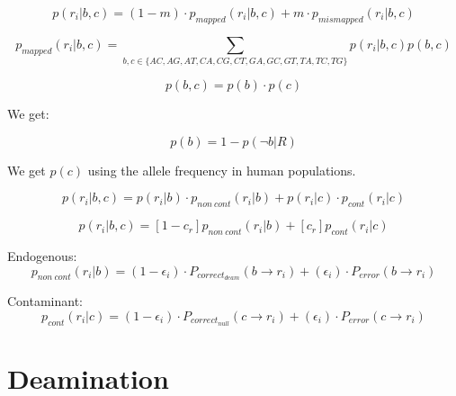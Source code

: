 \documentclass[a4paper,12pt]{article}
\begin{document}
\begin{equation}
p(r_i|b,c)  = (1-m) \cdot p_{mapped}(r_i|b,c) + m \cdot p_{mismapped}(r_i|b,c)  %
\end{equation}


\begin{equation}
p_{mapped}(r_i|b,c) = \sum\limits_{ b,c \in \{AC,AG,AT,CA,CG,CT,GA,GC,GT,TA,TC,TG\} } p(r_i|b,c) p(b,c)
\end{equation}

\begin{equation}
p(b,c) = p(b) \cdot p(c)
\end{equation}

\noindent We get:

\begin{equation}
p(b)  = 1 - p(\neg b|R)
\end{equation}

\noindent  We get $p(c)$ using the allele frequency in human populations.

\begin{equation}
p(r_i|b,c)  =  p(r_i|b) \cdot p_{non\ cont}(r_i|b)  +  p(r_i|c) \cdot p_{cont}(r_i|c) 
\end{equation}


\begin{equation}
p(r_i|b,c)  =  [1-c_r]  p_{non\ cont}(r_i|b) +  [c_r] p_{cont}(r_i|c) 
\end{equation}

\noindent Endogenous:
\begin{equation}
p_{non\ cont}(r_i|b) = (1-\epsilon_i ) \cdot  P_{correct_{deam}}( b \to r_i) +  (\epsilon_i) \cdot P_{error}(  b \to r_i )   
\end{equation}

\noindent Contaminant:
\begin{equation}
p_{cont}(r_i|c) = (1-\epsilon_i ) \cdot  P_{correct_{null}}( c \to r_i) +  (\epsilon_i) \cdot P_{error}(  c \to r_i )   
\end{equation}






\clearpage
\section{Deamination}


\end{document}
